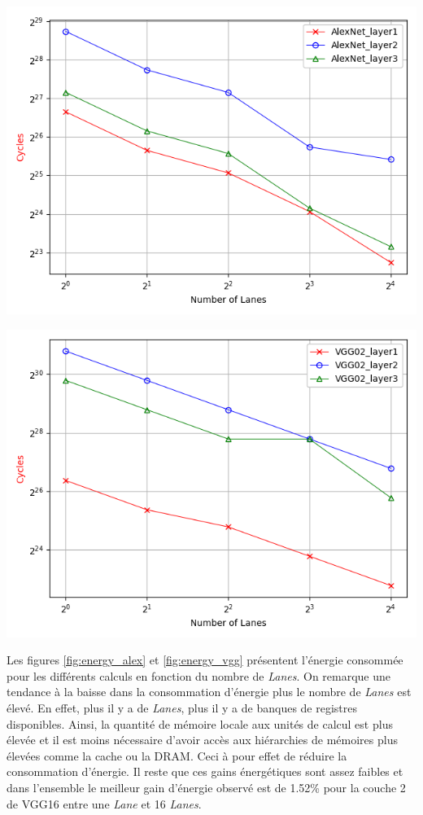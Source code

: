 \documentclass[10pt,letterpaper]{article}
\begin{document}
\begin{multicols}{2}
    {\centering
    \includegraphics[width=\linewidth]{Alex_cycles.png}
    \captionsetup{hypcap=false}
    \label{fig:cycles_alex}}
    \bigskip

    {\centering
    \includegraphics[width=\linewidth]{VGG_cycles.png}
    \captionsetup{hypcap=false}
    \label{fig:cycles_vgg}}
    \bigskip

    Les figures \ref{fig:energy_alex} et \ref{fig:energy_vgg} présentent l'énergie consommée pour les différents calculs
    en fonction du nombre de \textit{Lanes}. On remarque une tendance à la baisse dans la consommation d'énergie plus le nombre 
    de \textit{Lanes} est élevé. En effet, plus il y a de \textit{Lanes}, plus il y a de banques de registres disponibles. Ainsi,
    la quantité de mémoire locale aux unités de calcul est plus élevée et il est moins nécessaire d'avoir accès aux hiérarchies de 
    mémoires plus élevées comme la cache ou la DRAM. Ceci à pour effet de réduire la consommation d'énergie. Il reste que ces gains
    énergétiques sont assez faibles et dans l'ensemble le meilleur gain d'énergie observé est de 1.52\% pour la couche 2 de VGG16 entre 
    une \textit{Lane} et 16 \textit{Lanes}. 


\end{multicols}
\end{document}
